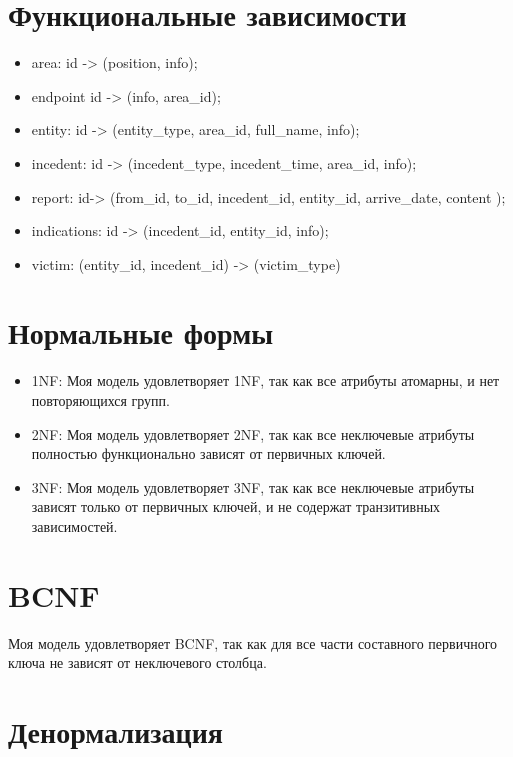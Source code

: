 \documentclass{article}
\begin{document}
\section{Функциональные зависимости}
\begin{itemize} 
  \item area:    id -> (position, info);
  \item endpoint id -> (info, area\_id);
  \item entity: id -> (entity\_type, area\_id, full\_name, info);
  \item incedent: id -> (incedent\_type, incedent\_time, area\_id, info);
  \item report: id-> (from\_id, to\_id, incedent\_id, entity\_id, arrive\_date, content );
  \item indications: id -> (incedent\_id, entity\_id, info);
  \item victim:  (entity\_id, incedent\_id) -> (victim\_type)
\end{itemize}

\section{Нормальные формы}

\begin{itemize}
  \item 1NF: Моя модель удовлетворяет 1NF, так как все атрибуты атомарны, и нет повторяющихся групп.
        
  \item 2NF: Моя модель удовлетворяет 2NF, так как все неключевые атрибуты полностью функционально зависят от первичных ключей.
        
  \item 3NF: Моя модель удовлетворяет 3NF, так как все неключевые атрибуты зависят только от первичных ключей, и не содержат транзитивных зависимостей.
        
\end{itemize}
\section{BCNF}
Моя модель удовлетворяет BCNF, так как для все части составного первичного ключа не зависят от неключевого столбца.

\section{Денормализация}
\end{document}

